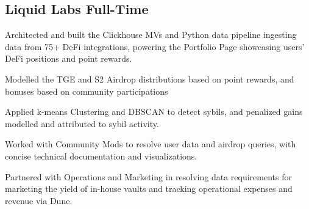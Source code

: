 
\subsection*{\color{UI_blue}Liquid Labs  \hfill Full-Time}
    \begin{zitemize}
        \item Architected and built the Clickhouse MVs and Python data pipeline ingesting data from 75+ DeFi integrations, powering the Portfolio Page showcasing users' DeFi positions and point rewards. 
        \item Modelled the TGE and S2 Airdrop distributions based on point rewards, and bonuses based on community participations
        \item Applied k-means Clustering and DBSCAN to detect sybils, and penalized gains modelled and attributed to sybil activity.
        \item Worked with Community Mods to resolve user data and airdrop queries, with concise technical documentation and visualizations.
        \item Partnered with Operations and Marketing in resolving data requirements for marketing the yield of in-house vaults and tracking operational expenses and revenue via Dune.
    \end{zitemize}

